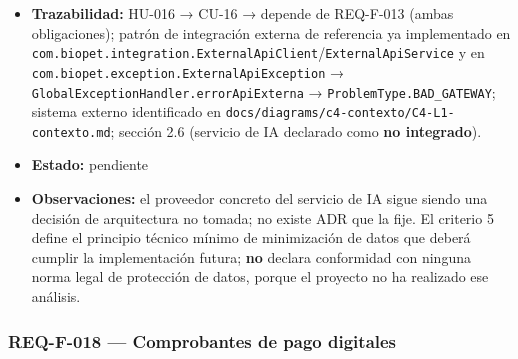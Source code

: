 \documentclass[
  spanish,
]{article}
\begin{document}
\begin{itemize}
  (c) la traducción de fallos del proveedor a \texttt{502} (criterio 4)
  y (d) la carga útil saliente campo por campo contra la lista permitida
  (criterios 5 y 6). No ejecutable hoy: no hay implementación.
\item
  \textbf{Trazabilidad:} HU-016 → CU-16 → depende de REQ-F-013 (ambas
  obligaciones); patrón de integración externa de referencia ya
  implementado en
  \texttt{com.\allowbreak{}biopet.\allowbreak{}integration.\allowbreak{}External\allowbreak{}Api\allowbreak{}Client}/\texttt{External\allowbreak{}Api\allowbreak{}Service}
  y en \texttt{com.\allowbreak{}biopet.\allowbreak{}exception.\allowbreak{}External\allowbreak{}Api\allowbreak{}Exception} →
  \texttt{Global\allowbreak{}Exception\allowbreak{}Handler.\allowbreak{}error\allowbreak{}Api\allowbreak{}Externa} →
  \texttt{Problem\allowbreak{}Type.\allowbreak{}BAD\_\allowbreak{}GATEWAY}; sistema externo identificado en
  \texttt{docs/\allowbreak{}diagrams/\allowbreak{}c4-\allowbreak{}contexto/\allowbreak{}C4-\allowbreak{}L1-\allowbreak{}contexto.\allowbreak{}md}; sección 2.6
  (servicio de IA declarado como \textbf{no integrado}).
\item
  \textbf{Estado:} pendiente
\item
  \textbf{Observaciones:} el proveedor concreto del servicio de IA sigue
  siendo una decisión de arquitectura no tomada; no existe ADR que la
  fije. El criterio 5 define el principio técnico mínimo de minimización
  de datos que deberá cumplir la implementación futura; \textbf{no}
  declara conformidad con ninguna norma legal de protección de datos,
  porque el proyecto no ha realizado ese análisis.
\end{itemize}

\subsubsection{REQ-F-018 --- Comprobantes de pago
digitales}\label{req-f-018-comprobantes-de-pago-digitales}
\end{document}
